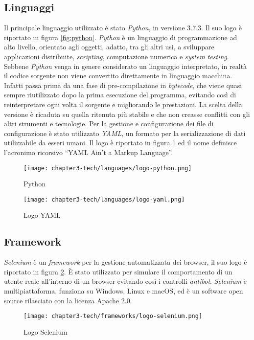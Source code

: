 \subsection{Linguaggi} \label{subsec: Linguaggi}
Il principale linguaggio utilizzato è stato \emph{Python}, in versione 3.7.3. Il suo logo è riportato in figura \ref{fig:python}. \emph{Python} è un linguaggio di programmazione ad alto livello, orientato agli oggetti, adatto, tra gli altri usi, a sviluppare applicazioni distribuite, \emph{scripting}, computazione numerica e \emph{system testing}. Sebbene \emph{Python} venga in genere considerato un linguaggio interpretato, in realtà il codice sorgente non viene convertito direttamente in linguaggio macchina. Infatti passa prima da una fase di pre-compilazione in \emph{bytecode}, che viene quasi sempre riutilizzato dopo la prima esecuzione del programma, evitando così di reinterpretare ogni volta il sorgente e migliorando le prestazioni. La scelta della versione è ricaduta su quella ritenuta più stabile e che non creasse conflitti con gli altri strumenti e tecnologie.\newline{}
Per la gestione e configurazione dei file di configurazione è stato utilizzato \emph{YAML}, un formato per la serializzazione di dati utilizzabile da esseri umani. Il logo è riportato in figura \ref{fig:yaml} ed il nome definisce l’acronimo ricorsivo ``YAML Ain’t a Markup Language''.
\begin{figure}[!h]
    \begin{minipage}{.5\textwidth} 
        \centering 
        \texttt{[image: chapter3-tech/languages/logo-python.png]} 
        \caption{Python} 
        \label{fig:python} 
    \end{minipage}%
    \begin{minipage}{.5\textwidth} 
        \centering 
        \texttt{[image: chapter3-tech/languages/logo-yaml.png]} 
        \caption{Logo YAML} 
        \label{fig:yaml} 
    \end{minipage}%
\end{figure}
\subsection{Framework} \label{subsec: Framework}
\emph{Selenium} è un \emph{framework} per la gestione automatizzata dei browser, il suo logo è riportato in figura \ref{fig:selenium}. È stato utilizzato per simulare il comportamento di un utente reale all’interno di un browser evitando così i controlli \emph{antibot}. \emph{Selenium} è multipiattaforma, funziona su Windows, Linux e macOS, ed è un software open source rilasciato con la licenza Apache 2.0.
\begin{figure}[!h] 
    \centering 
    \texttt{[image: chapter3-tech/frameworks/logo-selenium.png]} 
    \caption{Logo Selenium}
    \label{fig:selenium} 
\end{figure}


